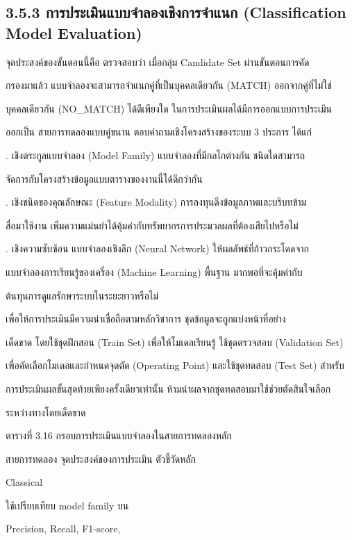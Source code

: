 \documentclass[12pt,a4paper]{report}
\begin{document}
\subsection*{3.5.3 การประเมินแบบจำลองเชิงการจำแนก (Classification Model Evaluation)}
จุดประสงค์ของขั้นตอนนี้คือ ตรวจสอบว่า เมื่อกลุ่ม Candidate Set ผ่านขั้นตอนการคัด\par
กรองมาแล้ว แบบจำลองจะสามารถจำแนกคู่ที่เป็นบุคคลเดียวกัน (MATCH) ออกจากคู่ที่ไม่ใช่\par
บุคคลเดียวกัน (NO\_MATCH) ได้ดีเพียงใด ในการประเมินผลได้มีการออกแบบการประเมิน\par
ออกเป็น สายการทดลองแบบคู่ขนาน ตอบคำถามเชิงโครงสร้างของระบบ 3 ประการ ได้แก่\par
{}. เชิงตระกูลแบบจำลอง (Model Family) แบบจำลองที่มีกลไกต่างกัน ชนิดใดสามารถ\par
จัดการกับโครงสร้างข้อมูลแบบตารางของงานนี้ได้ดีกว่ากัน\par
{}. เชิงชนิดของคุณลักษณะ (Feature Modality) การลงทุนดึงข้อมูลภาพและบริบทข้าม\par
สื่อมาใช้งาน เพิ่มความแม่นยำได้คุ้มค่ากับทรัพยากรการประมวลผลที่ต้องเสียไปหรือไม่\par
{}. เชิงความซับซ้อน แบบจำลองเชิงลึก (Neural Network) ให้ผลลัพธ์ที่ก้าวกระโดดจาก\par
แบบจำลองการเรียนรู้ของเครื่อง (Machine Learning) พื้นฐาน มากพอที่จะคุ้มค่ากับ\par
ต้นทุนการดูแลรักษาระบบในระยะยาวหรือไม่\par
เพื่อให้การประเมินมีความน่าเชื่อถือตามหลักวิชาการ ชุดข้อมูลจะถูกแบ่งหน้าที่อย่าง\par
เด็ดขาด โดยใช้ชุดฝึกสอน (Train Set) เพื่อให้โมเดลเรียนรู้ ใช้ชุดตรวจสอบ (Validation Set)\par
\clearpage
เพื่อคัดเลือกโมเดลและกำหนดจุดตัด (Operating Point) และใช้ชุดทดสอบ (Test Set) สำหรับ\par
การประเมินผลขั้นสุดท้ายเพียงครั้งเดียวเท่านั้น ห้ามนำผลจากชุดทดสอบมาใช้ช่วยตัดสินใจเลือก\par
ระหว่างทางโดยเด็ดขาด\par
\begin{center}\small ตารางที่ 3.16 กรอบการประเมินแบบจำลองในสายการทดลองหลัก\end{center}
สายการทดลอง จุดประสงค์ของการประเมิน ตัวชี้วัดหลัก\par
Classical\par
ใช้เปรียบเทียบ model family บน\par
Precision, Recall, F1-score,\par
\end{document}

